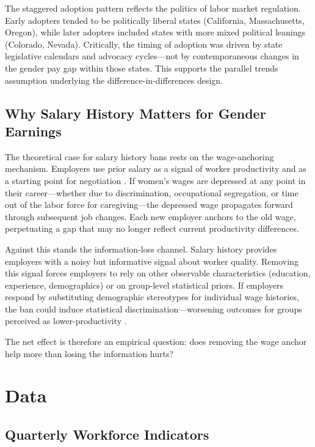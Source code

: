 \documentclass[12pt]{article}
\begin{document}
The staggered adoption pattern reflects the politics of labor market regulation. Early adopters tended to be politically liberal states (California, Massachusetts, Oregon), while later adopters included states with more mixed political leanings (Colorado, Nevada). Critically, the timing of adoption was driven by state legislative calendars and advocacy cycles---not by contemporaneous changes in the gender pay gap within those states. This supports the parallel trends assumption underlying the difference-in-differences design.

\subsection{Why Salary History Matters for Gender Earnings}

The theoretical case for salary history bans rests on the wage-anchoring mechanism. Employers use prior salary as a signal of worker productivity and as a starting point for negotiation \citep{BarachHorton2021}. If women's wages are depressed at any point in their career---whether due to discrimination, occupational segregation, or time out of the labor force for caregiving---the depressed wage propagates forward through subsequent job changes. Each new employer anchors to the old wage, perpetuating a gap that may no longer reflect current productivity differences.

Against this stands the information-loss channel. Salary history provides employers with a noisy but informative signal about worker quality. Removing this signal forces employers to rely on other observable characteristics (education, experience, demographics) or on group-level statistical priors. If employers respond by substituting demographic stereotypes for individual wage histories, the ban could induce statistical discrimination---worsening outcomes for groups perceived as lower-productivity \citep{DoleacHansen2020}.

The net effect is therefore an empirical question: does removing the wage anchor help more than losing the information hurts?


\section{Data}

\subsection{Quarterly Workforce Indicators}
\end{document}

